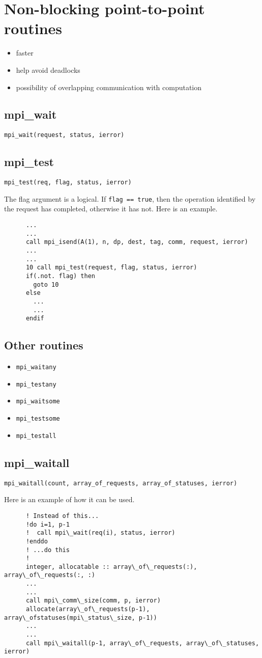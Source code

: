 \documentclass[10pt]{article}
\newenvironment{mitemize}
{
  \begin{itemize}
  \setlength{\itemsep}{1pt}
  \setlength{\parskip}{0pt}
  \setlength{\parsep}{0pt}}{\end{itemize}
}
\begin{document}
\section*{Non-blocking point-to-point routines}
\begin{mitemize}
  \item faster
  \item help avoid deadlocks
  \item possibility of overlapping communication with computation
\end{mitemize}

\subsection*{mpi\_wait}
\texttt{mpi\_wait(request, status, ierror)}

\subsection*{mpi\_test}
\texttt{mpi\_test(req, flag, status, ierror)}

The flag argument is a logical. If \texttt{flag == true}, then the operation identified by the request has completed, otherwise it has not. Here is an example.
\begin{verbatim}
      ...
      ...
      call mpi_isend(A(1), n, dp, dest, tag, comm, request, ierror)
      ...
      ...
      10 call mpi_test(request, flag, status, ierror)
      if(.not. flag) then
        goto 10
      else
        ...
        ...
      endif
\end{verbatim}

\subsection*{Other routines}
\begin{mitemize}
   \item \texttt{mpi\_waitany}
   \item \texttt{mpi\_testany}
   \item \texttt{mpi\_waitsome}
   \item \texttt{mpi\_testsome}
   \item \texttt{mpi\_testall}
\end{mitemize}

\subsection*{mpi\_waitall}
\texttt{mpi\_waitall(count, array\_of\_requests, array\_of\_statuses, ierror)}

Here is an example of how it can be used.
\begin{verbatim}
      ! Instead of this...
      !do i=1, p-1
      !  call mpi\_wait(req(i), status, ierror)
      !enddo
      ! ...do this
      !
      integer, allocatable :: array\_of\_requests(:), array\_of\_requests(:, :)
      ...
      ...
      call mpi\_comm\_size(comm, p, ierror)
      allocate(array\_of\_requests(p-1), array\_ofstatuses(mpi\_status\_size, p-1))
      ...
      ...
      call mpi\_waitall(p-1, array\_of\_requests, array\_of\_statuses, ierror)
\end{verbatim}
\end{document}

